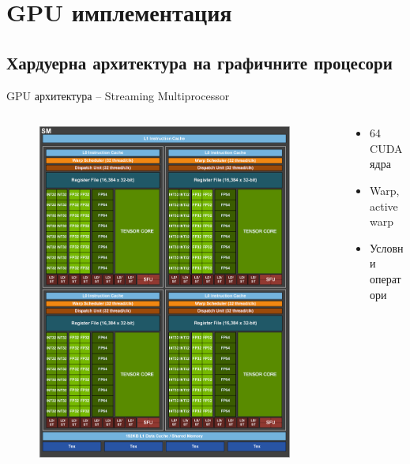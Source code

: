 \documentclass{beamer}
\begin{document}
\fi

\section{GPU имплементация}
\subsection{Хардуерна архитектура на графичните процесори}
\begin{frame}{GPU архитектура -- Streaming Multiprocessor}
\begin{columns} 
    \begin{column}{.5\textwidth}
        \begin{figure}[H]
  \centering
  \includegraphics[width=0.95\textwidth]{../../Figures/presentation/sm.png}
\end{figure}
    \end{column}
    \begin{column}{.5\textwidth}
		\begin{itemize}[<+->]
			\item 64 CUDA ядра
			\item Warp, active warp
			\item Условни оператори
		\end{itemize}
    \end{column}
\end{columns}
\end{frame}
\end{document}
